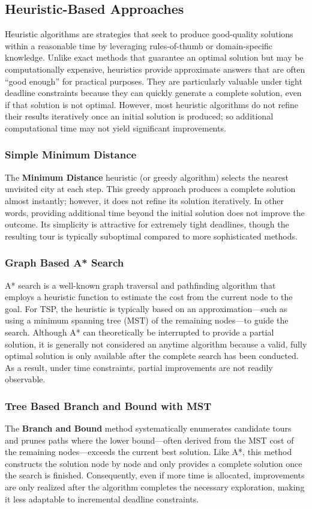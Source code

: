 \documentclass[11pt]{article}
\begin{document}
	\subsection{Heuristic-Based Approaches}
	Heuristic algorithms are strategies that seek to produce good-quality solutions within a reasonable time by leveraging rules-of-thumb or domain-specific knowledge. Unlike exact methods that guarantee an optimal solution but may be computationally expensive, heuristics provide approximate answers that are often “good enough” for practical purposes. They are particularly valuable under tight deadline constraints because they can quickly generate a complete solution, even if that solution is not optimal. However, most heuristic algorithms do not refine their results iteratively once an initial solution is produced; so additional computational time may not yield significant improvements.
	
	\subsubsection{Simple Minimum Distance}
	The \textbf{Minimum Distance} heuristic (or greedy algorithm) selects the nearest unvisited city at each step. This greedy approach produces a complete solution almost instantly; however, it does not refine its solution iteratively. In other words, providing additional time beyond the initial solution does not improve the outcome. Its simplicity is attractive for extremely tight deadlines, though the resulting tour is typically suboptimal compared to more sophisticated methods.
	
	\subsubsection{Graph Based A* Search}
	A* search is a well-known graph traversal and pathfinding algorithm that employs a heuristic function to estimate the cost from the current node to the goal. For TSP, the heuristic is typically based on an approximation—such as using a minimum spanning tree (MST) of the remaining nodes—to guide the search. Although A* can theoretically be interrupted to provide a partial solution, it is generally not considered an anytime algorithm because a valid, fully optimal solution is only available after the complete search has been conducted. As a result, under time constraints, partial improvements are not readily observable.
	
	\subsubsection{Tree Based Branch and Bound with MST}
	The \textbf{Branch and Bound} method systematically enumerates candidate tours and prunes paths where the lower bound—often derived from the MST cost of the remaining nodes—exceeds the current best solution. Like A*, this method constructs the solution node by node and only provides a complete solution once the search is finished. Consequently, even if more time is allocated, improvements are only realized after the algorithm completes the necessary exploration, making it less adaptable to incremental deadline constraints.
\end{document}
